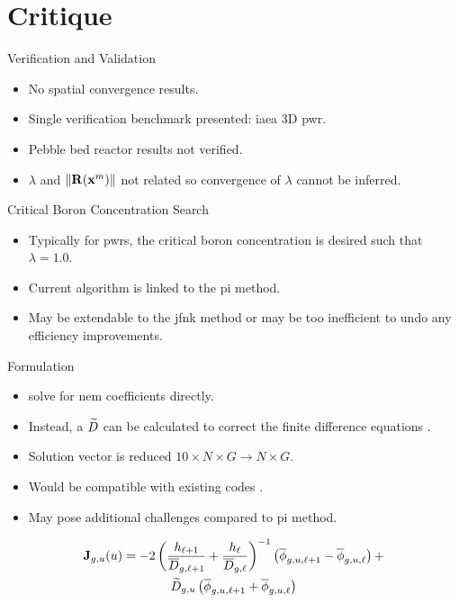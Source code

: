 \section{Critique}
\label{sec:critique}

\begin{frame}{Verification and Validation}
  \begin{itemize}
    \item No spatial convergence results.
    \item Single verification benchmark presented: \gls{iaea} 3D \gls{pwr}.
    \item Pebble bed reactor results not verified.
    \item $\lambda$ and $\| \mathbf{R}(\mathbf{x}^m) \|$ not related so convergence of
      $\lambda$ cannot be inferred.
  \end{itemize}
\end{frame}

\begin{frame}{Critical Boron Concentration Search}
  \begin{itemize}
    \item Typically for \glspl{pwr}, the critical boron concentration is
      desired such that $\lambda = 1.0$.
    \item Current algorithm is linked to the \gls{pi} method.
    \item May be extendable to the \gls{jfnk} method or may be too inefficient
      to undo any efficiency improvements.
  \end{itemize}
\end{frame}

\begin{frame}{ Formulation}
  \begin{itemize}
    \item \citeauthor{qe2paper} solve for \gls{nem} coefficients directly.
    \item Instead, a $\widetilde{D}$ can be calculated to correct the finite
      difference equations \cite{smith_nonlinear,palmtagThesis}.
    \item Solution vector is reduced $10 \times N \times G \rightarrow N \times G$.
    \item Would be compatible with existing codes \cite{casmo4,simulate3,mpact}.
    \item May pose additional challenges compared to \gls{pi} method.
  \end{itemize}
  \begin{multline}
    \label{eq:dtilde}
    \mathbf{J}_{g,u}(u) = 
      -2 \left( \frac{h_{\ell+1}}{\overline{D}_{g,\ell+1}} + 
        \frac{h_{\ell}}{\overline{D}_{g,\ell}} \right)^{-1}
        \left( \overline{\phi}_{g,u,\ell+1} -
        \overline{\phi}_{g,u,\ell} \right) +  \\
      \widetilde{D}_{g,u} \left( \overline{\phi}_{g,u,\ell+1} +
        \overline{\phi}_{g,u,\ell} \right)
  \end{multline}
\end{frame}

